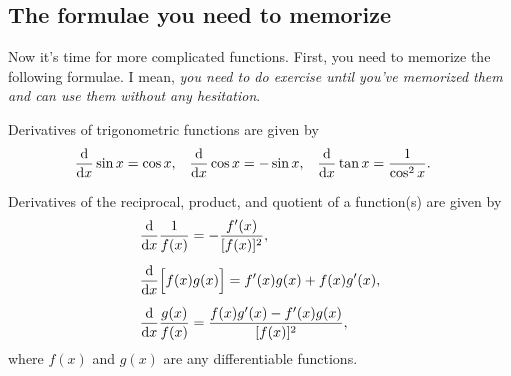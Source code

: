 \documentclass[11pt,pdfa,lastpage]{MishoNote}
\begin{document}
\subsection{The formulae you need to memorize}
Now it's time for more complicated functions. First, you need to memorize the following formulae.
I mean, \emph{you need to do exercise until you've memorized them and can use them without any hesitation}.

\begin{theorem}{}{}
  Derivatives of trigonometric functions are given by
  \begin{align}
   \diff{}{x}\sin x &= \cos x,&
   \diff{}{x}\cos x &= -\sin x,&
   \diff{}{x}\tan x &= \frac1{\cos^2x}.\label{eq:trig}
  \end{align}
\end{theorem}
\begin{theorem}{}{}
  Derivatives of the reciprocal, product, and quotient of a function(s) are given by
  \begin{align}
   &\label{eq:reci} \diff{}{x}\frac{1}{f(x)}=-\frac{f'(x)}{[f(x)]^2},\\[0.5em]
   &\label{eq:prod} \diff{}{x}\Bigl[f(x)g(x)\Bigr]=f'(x)g(x)+f(x)g'(x),\\[0.5em]
   &\label{eq:quot} \diff{}{x}\frac{g(x)}{f(x)}=\frac{f(x)g'(x)-f'(x)g(x)}{[f(x)]^2},
   \end{align}
   where  $f(x)$ and $g(x)$ are any differentiable functions.
\end{theorem}
\end{document}
